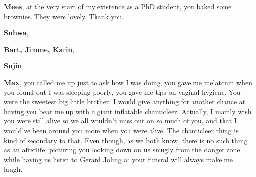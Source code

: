 {\bfseries Mees}, at the very start of my existence as a PhD student, you baked some brownies. They were lovely. Thank you.

{\bfseries Suhwa},



{\bfseries Bart, Jimme, Karin},

{\bfseries Sujin},

{\bfseries Max}, you called me up just to ask how I was doing, you gave me melatonin when you found out I was sleeping poorly, you gave me tips on vaginal hygiene. You were the sweetest big little brother. I would give anything for another chance at having you beat me up with a giant inflatable chanticleer. Actually, I mainly wish you were still alive so we all wouldn't miss out on so much of you, and that I would've been around you more when you were alive. The chanticleer thing is kind of secondary to that. Even though, as we both know, there is no such thing as an afterlife, picturing you looking down on us smugly from the danger zone while having us listen to Gerard Joling at your funeral will always make me laugh.
